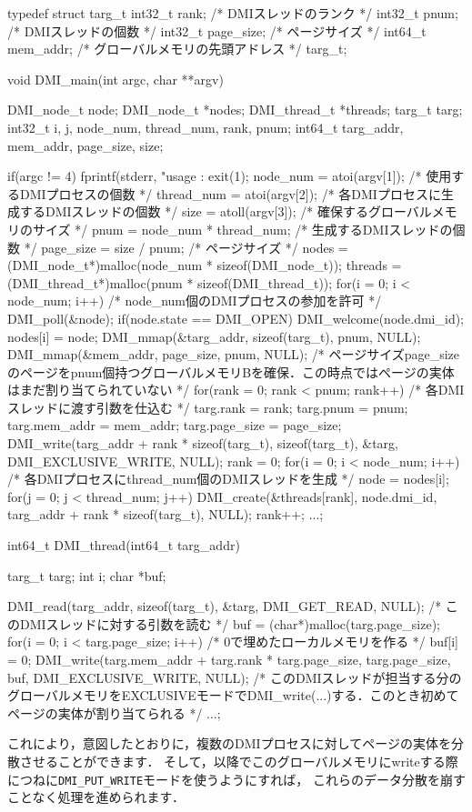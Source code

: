 \documentclass[report,12pt]{jsbook}
\begin{document}
\begin{code}
typedef struct targ_t
{
  int32_t rank;  /* DMIスレッドのランク */
  int32_t pnum;  /* DMIスレッドの個数 */
  int32_t page_size;  /* ページサイズ */
  int64_t mem_addr;  /* グローバルメモリの先頭アドレス */
}targ_t;

void DMI_main(int argc, char **argv)
{
  DMI_node_t node;
  DMI_node_t *nodes;
  DMI_thread_t *threads;
  targ_t targ;
  int32_t i, j, node_num, thread_num, rank, pnum;
  int64_t targ_addr, mem_addr, page_size, size;

  if(argc != 4)
    {
      fprintf(stderr, "usage : %
      exit(1);
    } 
  node_num = atoi(argv[1]);  /* 使用するDMIプロセスの個数 */
  thread_num = atoi(argv[2]);  /* 各DMIプロセスに生成するDMIスレッドの個数 */
  size = atoll(argv[3]);  /* 確保するグローバルメモリのサイズ */
  pnum = node_num * thread_num;  /* 生成するDMIスレッドの個数 */
  page_size = size / pnum;  /* ページサイズ */
  nodes = (DMI_node_t*)malloc(node_num * sizeof(DMI_node_t));
  threads = (DMI_thread_t*)malloc(pnum * sizeof(DMI_thread_t));
  for(i = 0; i < node_num; i++)  /* node_num個のDMIプロセスの参加を許可 */
    {
      DMI_poll(&node);
      if(node.state == DMI_OPEN)
        {
          DMI_welcome(node.dmi_id);
          nodes[i] = node;  
        }
    }
  DMI_mmap(&targ_addr, sizeof(targ_t), pnum, NULL);
  DMI_mmap(&mem_addr, page_size, pnum, NULL);  /* ページサイズpage_sizeのページをpnum個持つグローバルメモリBを確保．この時点ではページの実体はまだ割り当てられていない */
  for(rank = 0; rank < pnum; rank++)  /* 各DMIスレッドに渡す引数を仕込む */
    {
      targ.rank = rank;
      targ.pnum = pnum;
      targ.mem_addr = mem_addr;
      targ.page_size = page_size;
      DMI_write(targ_addr + rank * sizeof(targ_t), sizeof(targ_t), &targ, DMI_EXCLUSIVE_WRITE, NULL);
    }
  rank = 0;
  for(i = 0; i < node_num; i++)  /* 各DMIプロセスにthread_num個のDMIスレッドを生成 */
    {
      node = nodes[i];
      for(j = 0; j < thread_num; j++)
        {
          DMI_create(&threads[rank], node.dmi_id, targ_addr + rank * sizeof(targ_t), NULL);
          rank++;
        }
    }
  ...;
}

int64_t DMI_thread(int64_t targ_addr)
{
  targ_t targ;
  int i;
  char *buf;

  DMI_read(targ_addr, sizeof(targ_t), &targ, DMI_GET_READ, NULL);  /* このDMIスレッドに対する引数を読む */
  buf = (char*)malloc(targ.page_size);
  for(i = 0; i < targ.page_size; i++)  /* 0で埋めたローカルメモリを作る */
    {
      buf[i] = 0;
    }
  DMI_write(targ.mem_addr + targ.rank * targ.page_size, targ.page_size, buf, DMI_EXCLUSIVE_WRITE, NULL);  /* このDMIスレッドが担当する分のグローバルメモリをEXCLUSIVEモードでDMI_write(...)する．このとき初めてページの実体が割り当てられる */
  ...;
}
\end{code}
これにより，意図したとおりに，複数のDMIプロセスに対してページの実体を分散させることができます．
そして，以降でこのグローバルメモリにwriteする際につねに\texttt{DMI\_PUT\_WRITE}モードを使うようにすれば，
これらのデータ分散を崩すことなく処理を進められます．
\end{document}
